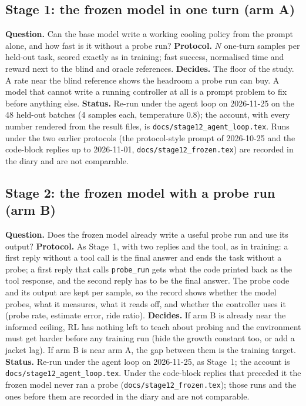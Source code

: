 \documentclass[11pt,a4paper]{article}
\begin{document}
\subsection{Stage 1: the frozen model in one turn (arm A)}
\textbf{Question.} Can the base model write a working cooling policy from the prompt alone, and how fast is it without a probe run?
\textbf{Protocol.} $N$ one-turn samples per held-out task, scored exactly as in training; fast success, normalised time and reward next to the blind and oracle references.
\textbf{Decides.} The floor of the study. A rate near the blind reference shows the headroom a probe run can buy. A model that cannot write a running controller at all is a prompt problem to fix before anything else.
\textbf{Status.} Re-run under the agent loop on 2026-11-25 on the 48 held-out batches (4 samples each, temperature 0.8); the account, with every number rendered from the result files, is \texttt{docs/stage12\_agent\_loop.tex}. Runs under the two earlier protocols (the protocol-style prompt of 2026-10-25 and the code-block replies up to 2026-11-01, \texttt{docs/stage12\_frozen.tex}) are recorded in the diary and are not comparable.

\subsection{Stage 2: the frozen model with a probe run (arm B)}
\textbf{Question.} Does the frozen model already write a useful probe run and use its output?
\textbf{Protocol.} As Stage~1, with two replies and the tool, as in training: a first reply without a tool call is the final answer and ends the task without a probe; a first reply that calls \texttt{probe\_run} gets what the code printed back as the tool response, and the second reply has to be the final answer. The probe code and its output are kept per sample, so the record shows whether the model probes, what it measures, what it reads off, and whether the controller uses it (probe rate, estimate error, ride ratio).
\textbf{Decides.} If arm B is already near the informed ceiling, RL has nothing left to teach about probing and the environment must get harder before any training run (hide the growth constant too, or add a jacket lag). If arm B is near arm A, the gap between them is the training target.
\textbf{Status.} Re-run under the agent loop on 2026-11-25, as Stage~1; the account is \texttt{docs/stage12\_agent\_loop.tex}. Under the code-block replies that preceded it the frozen model never ran a probe (\texttt{docs/stage12\_frozen.tex}); those runs and the ones before them are recorded in the diary and are not comparable.
\end{document}
